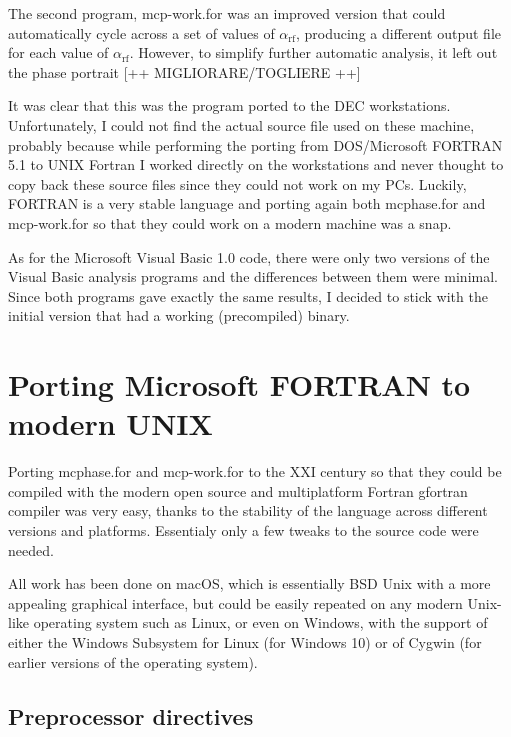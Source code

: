 The second program, \textsf{mcp-work.for} was an improved version that could automatically cycle across a  set of values of $\alpha_\mathrm{rf}$, producing a different output file for each value of $\alpha_\mathrm{rf}$. However, to simplify further automatic analysis, it left out the phase portrait [++ MIGLIORARE/TOGLIERE ++]

It was clear that this was the program ported to the DEC workstations. 
Unfortunately, I could not find the actual source file used on these machine, probably because while performing the porting from DOS/Microsoft FORTRAN 5.1 to UNIX Fortran I worked directly on the workstations and never thought to copy back these source files since they could not work on my PCs.
Luckily, FORTRAN is a very stable language and porting again both \textsf{mcphase.for} and \textsf{mcp-work.for} so that they could work on a modern machine was a snap.

As for the Microsoft Visual Basic 1.0 code, there were only two versions of the Visual Basic analysis programs and the differences between them were minimal. Since both programs gave exactly the same results, I decided to stick with the initial version that had a working (precompiled) binary.



\section{Porting Microsoft FORTRAN to modern UNIX}

Porting \textsf{mcphase.for} and \textsf{mcp-work.for} to the XXI century so that they could be compiled with the modern open source and multiplatform Fortran \textsf{gfortran} compiler was very easy, thanks to the stability of the language across different versions and platforms. Essentialy only a few tweaks to the source code were needed.

All work has been done on macOS, which is essentially BSD Unix with a more appealing graphical interface, but could be easily repeated on any modern Unix-like operating system such as Linux, or even on Windows, with the support of either the Windows Subsystem for Linux (for Windows 10) or of Cygwin (for earlier versions of the operating system).



\subsection{Preprocessor directives}

